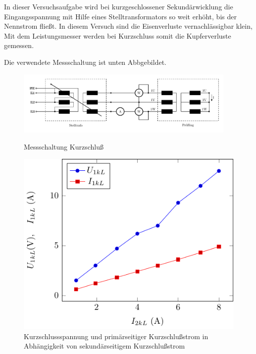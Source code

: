 
In dieser Versuchsaufgabe wird bei kurzgeschlossener Sekundärwicklung die Eingangsspannung mit Hilfe eines Stelltransformators
so weit erhöht, bis der Nennstrom fließt.
In diesem Versuch sind die Eisenverluste vernachlässigbar klein,
Mit dem Leistungsmesser werden bei Kurzschluss somit die Kupferverluste  gemessen.

\par 
Die verwendete Messschaltung ist unten Abbgebildet.  \par
\begin{figure}[h]
    \centering
    \includegraphics[width=0.95\textwidth]{fig/kz_mess.pdf}
    \caption{Messschaltung Kurzschluß}
    \label{fig:my_label}
 \includegraphics{fig/kz.pdf}
    \caption{Kurzschlussspannung und primärseitiger Kurzschlußstrom in Abhängigkeit von sekundärseitigem Kurzschlußstrom}
\end{figure}

